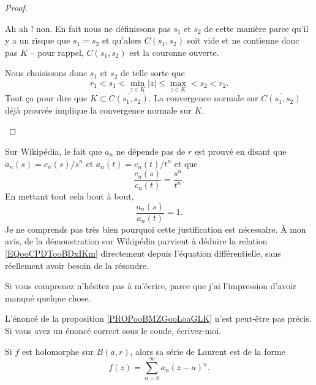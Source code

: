 \begin{proof}
\begin{subproof}
\begin{subproof}
            Ah ah ! non. En fait nous ne définissons pas \( s_1\) et \( s_2\) de cette manière parce qu'il y a un risque que \( s_1=s_2\) et qu'alors \( \overline{ C(s_1,s_2) }\) soit vide et ne contienne donc pas \( K\) -- pour rappel, \( C(s_1,s_2)\) est la couronne ouverte.

            Nous choisissons donc \( s_1\) et \( s_2\) de telle sorte que
            \begin{equation}
                r_1<s_1<\min_{z\in K}| z |\leq \max_{z\in K}<s_2<r_2.
            \end{equation}
            Tout ça pour dire que \( K\subset \overline{ C(s_1,s_2) }\). La convergence normale sur \( \overline{ C(s_1,s_2) }\) déjà prouvée implique la convergence normale sur \( K\).
        \end{subproof}
        \end{subproof}
\end{proof}

\begin{probleme}        \label{PROPBooYWDNooMXVPLJ}
    Sur Wikipédia\cite{BIBooUBUAooHyhrlg}, le fait que \( a_n\) ne dépende pas de \( r\) est prouvé en disant que \( a_n(s)=c_n(s)/s^n\) et \( a_n(t)=c_n(t)/t^n\) et que
    \begin{equation}        \label{EQooCPDTooBDxIKm}
        \frac{ c_n(s) }{ c_n(t) }=\frac{ s^n }{ t^n }.
    \end{equation}
    En mettant tout cela bout à bout, 
    \begin{equation}
        \frac{ a_n(s) }{ a_n(t) }=1.
    \end{equation}
    Je ne comprends pas très bien pourquoi cette justification est nécessaire. À mon avis,  de la démonstration sur Wikipédia parvient à déduire la relation \eqref{EQooCPDTooBDxIKm} directement depuis l'équation différentielle, sans réellement avoir besoin de la résoudre.

    Si vous comprenez n'hésitez pas à m'écrire, parce que j'ai l'impression d'avoir manqué quelque chose.
\end{probleme}

\begin{probleme}
    L'énoncé de la proposition \ref{PROPooBMZGooLoaGLK} n'est peut-être pas précis. Si vous avez un énoncé correct sous le coude, écrivez-moi.
\end{probleme}

\begin{proposition}     \label{PROPooBMZGooLoaGLK}
    Si \( f\) est holomorphe sur \( B(a,r)\), alors sa série de Laurent est de la forme
    \begin{equation}
        f(z)=\sum_{n=0}^{\infty}a_n(z-a)^n.
    \end{equation}
\end{proposition}

